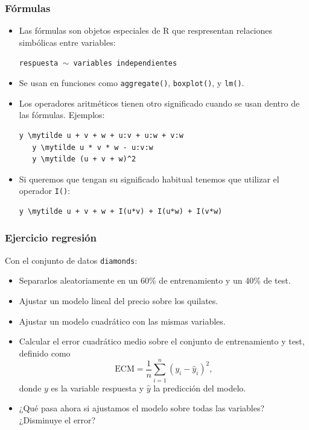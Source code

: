 \documentclass{beamer}
\newcommand{\mytilde}{$\sim$}
\begin{document}
\begin{frame}[fragile]
\frametitle{Fórmulas}
\begin{itemize}
\item Las fórmulas son objetos especiales de R que respresentan relaciones simbólicas entre variables:

\texttt{respuesta \mytilde\  variables independientes}

\item Se usan en funciones como \texttt{aggregate()}, \texttt{boxplot()}, y \texttt{lm()}.

\item Los operadores aritméticos tienen otro significado cuando se usan dentro de las fórmulas. Ejemplos:

\begin{Verbatim}[commandchars=\\\{\}]
   y \mytilde u + v + w + u:v + u:w + v:w
   y \mytilde u * v * w - u:v:w
   y \mytilde (u + v + w)^2
\end{Verbatim}

\item Si queremos que tengan su significado habitual tenemos que utilizar el operador \texttt{I()}:
\begin{Verbatim}[commandchars=\\\{\}]
   y \mytilde u + v + w + I(u*v) + I(u*w) + I(v*w)
\end{Verbatim}
\end{itemize}
\end{frame}


\begin{frame}
\frametitle{Ejercicio regresión}
Con el conjunto de datos \texttt{diamonds}:
\begin{itemize}
\item Separarlos aleatoriamente en un 60\% de entrenamiento y un 40\% de test.
\item Ajustar un modelo lineal del precio sobre los quilates.
\item Ajustar un modelo cuadrático con las mismas variables.
\item Calcular el error cuadrático medio sobre el conjunto de entrenamiento y test, definido como $$\text{ECM} = \frac{1}{n}\sum_{i=1}^{n}{(y_i - \hat{y}_i)^2},$$ donde $y$ es la variable respuesta y $\hat{y}$ la predicción del modelo.
\item ¿Qué pasa ahora si ajustamos el modelo sobre todas las variables? ¿Disminuye el error?
\end{itemize}
\end{frame}
\end{document}

